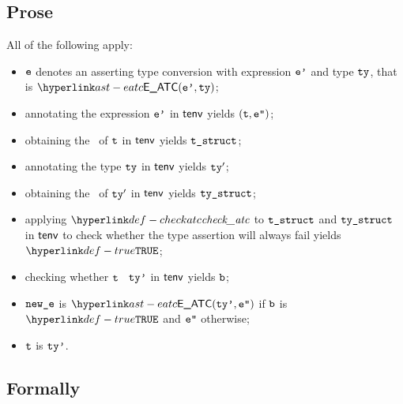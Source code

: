 \subsection{Prose}
All of the following apply:
\begin{itemize}
  \item $\ve$ denotes an asserting type conversion with expression $\vep$ and type $\tty$, that is $\EATC(\vep, \tty)$;
  \item annotating the expression $\vep$ in $\tenv$ yields $(\vt, \vepp)$\ProseOrTypeError;
  \item obtaining the \structure\ of $\vt$ in $\tenv$ yields $\vtstruct$\ProseOrTypeError;
  \item annotating the type $\tty$ in $\tenv$ yields $\tty'$\ProseOrTypeError;
  \item obtaining the \structure\ of $\tty'$ in $\tenv$ yields $\vtystruct$\ProseOrTypeError;
  \item applying $\checkatc$ to $\vtstruct$ and $\vtystruct$ in $\tenv$ to check whether the type assertion
        will always fail yields $\True$\ProseOrTypeError;
  \item checking whether $\vt$ \subtypesatisfies\ $\ttyp$ in $\tenv$ yields $\vb$\ProseOrTypeError;
  \item $\newe$ is $\EATC(\ttyp, \vepp)$ if $\vb$ is $\True$ and $\vepp$ otherwise;
  \item $\vt$ is $\ttyp$.
\end{itemize}



\subsection{Formally}
\begin{mathpar}
\end{mathpar}

